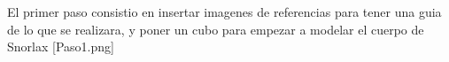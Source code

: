 El primer paso consistio en insertar imagenes de referencias para tener una guia de lo que se realizara, y poner un cubo para empezar a modelar el cuerpo de Snorlax
[Paso1.png]

